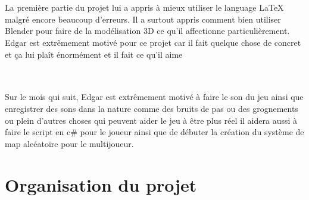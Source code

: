 \documentclass[titlepage, 13px, a4paper]{article}
\begin{document}
\paragraph{} \hspace{0pt} \\
La première partie du projet lui a appris à mieux utiliser le language \LaTeX
malgré encore beaucoup d'erreurs. Il a surtout appris comment bien utiliser Blender pour faire de la modélisation 3D ce qu'il affectionne particulièrement. 
Edgar est extrêmement motivé pour ce projet car il fait quelque chose de concret et ça lui plaît énormément et il fait ce qu'il aime

\paragraph{} \hspace{0pt} \\
Sur le mois qui suit, Edgar est extrêmement motivé à faire le son du jeu ainsi que enregistrer des sons dans la nature comme des bruits de pas ou 
des grognements ou plein d'autres choses qui peuvent aider le jeu à être plus réel il aidera aussi à faire le script en c\# pour le joueur 
ainsi que de débuter la création du système de map aleéatoire pour le multijoueur.

\newpage
\part{Organisation du projet}
\end{document}
